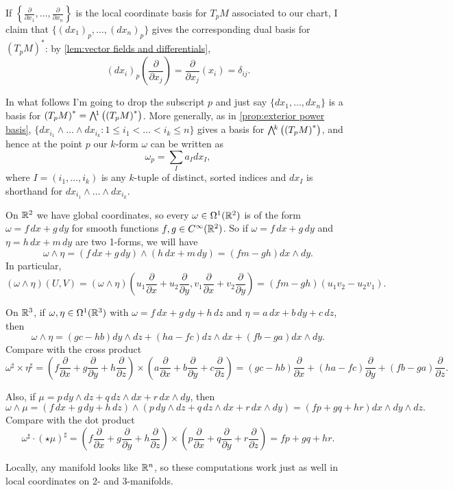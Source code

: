 If $\left\{\frac{\partial}{\partial x_1}, \dots , \frac{\partial}{\partial x_n}\right\}$ is the local coordinate basis for $T_pM$ associated to our chart, I claim that $\{(dx_1)_p, \dots , (dx_n)_p\}$ gives the corresponding dual basis for $\left(T_pM\right)^\ast$: by \cref{lem:vector fields and differentials},
\[
	(dx_i)_p \left(\frac{\partial}{\partial x_j}\right) = \frac{\partial}{\partial x_j}(x_i) = \delta_{ij}.
\]

In what follows I'm going to drop the subscript $p$ and just say $\{dx_1, \dots, dx_n\}$ is a basis for $\left(T_pM\right)^\ast = \ext{1}\left(\left(T_pM\right)^\ast\right)$. More generally, as in \cref{prop:exterior power basis}, $\{dx_{i_1} \wedge \dots \wedge dx_{i_k}: 1 \leq i_1 < \dots < i_k \leq n\}$ gives a basis for $\ext{k}\left(\left(T_pM\right)^\ast \right)$, and hence at the point $p$ our $k$-form $\omega$ can be written as
\[
	\omega_p = \sum_I a_I dx_I,
\]
where $I = (i_1, \dots , i_k)$ is any $k$-tuple of distinct, sorted indices and $dx_I$ is shorthand for $dx_{i_1} \wedge \dots \wedge dx_{i_k}$.

\begin{example}
	On $\mathbb{R}^2$ we have global coordinates, so every $\omega \in \Omega^1(\mathbb{R}^2)$ is of the form $\omega = f\, dx + g\, dy$ for smooth functions $f,g \in C^\infty (\mathbb{R}^2)$. So if $\omega = f\, dx + g \, dy$ and $\eta = h\, dx + m\, dy$ are two 1-forms, we will have
	\[
		\omega \wedge \eta = (f\, dx + g\, dy) \wedge (h\, dx + m\, dy) = (fm - gh) dx \wedge dy.
	\]
	In particular,
	\[
		(\omega \wedge \eta)(U,V) = (\omega \wedge \eta)\left(u_1 \frac{\partial}{\partial x} + u_2 \frac{\partial}{\partial y}, v_1 \frac{\partial}{\partial x} + v_2 \frac{\partial}{\partial y}\right) = (fm-gh)(u_1 v_2 - u_2 v_1).
	\]
\end{example}

\begin{example}
	On $\mathbb{R}^3$, if $\omega, \eta \in \Omega^1(\mathbb{R}^3)$ with $\omega = f \, dx + g \, dy + h \, dz$ and $\eta = a\, dx + b\, dy + c \, dz$, then
	\[
		\omega \wedge \eta = (gc-hb)dy \wedge dz + (ha-fc)dz \wedge dx + (fb-ga)dx \wedge dy.
	\]
	Compare with the cross product
	\[
		\omega^\sharp \times \eta^\sharp = \left(f \frac{\partial}{\partial x} + g \frac{\partial}{\partial y}+h \frac{\partial}{\partial z}\right) \times \left( a \frac{\partial}{\partial x} + b \frac{\partial}{\partial y}+ c \frac{\partial}{\partial z}\right) = (gc-hb) \frac{\partial}{\partial x} + (ha-fc) \frac{\partial}{\partial y} + (fb-ga) \frac{\partial}{\partial z}.
	\]
	
	Also, if $\mu = p\, dy \wedge dz + q\, dz \wedge dx + r\, dx \wedge dy$, then
	\[
		\omega \wedge \mu = (f \, dx + g \, dy + h \, dz ) \wedge (p\, dy \wedge dz + q\, dz \wedge dx + r\, dx \wedge dy) = (fp + gq + hr) dx \wedge dy \wedge dz.
	\]
	Compare with the dot product
	\[
		\omega^\sharp \cdot (\star \mu)^\sharp = \left(f \frac{\partial}{\partial x} + g \frac{\partial}{\partial y}+h \frac{\partial}{\partial z}\right) \times \left( p \frac{\partial}{\partial x} + q \frac{\partial}{\partial y}+ r \frac{\partial}{\partial z}\right) = fp + gq + hr.
	\]
\end{example}

Locally, any manifold looks like $\mathbb{R}^n$, so these computations work just as well in local coordinates on 2- and 3-manifolds.